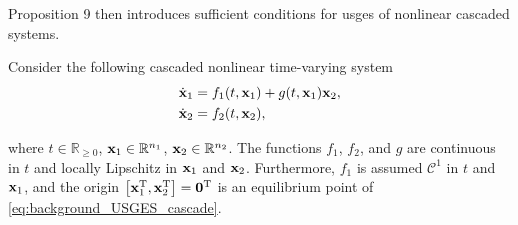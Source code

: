 Proposition 9 then introduces sufficient conditions for \acrfull{usges} of nonlinear cascaded systems.
\begin{prop}
    \label{prop:background_cascade}
    Consider the following cascaded nonlinear time-varying system
    \begin{subequations}
        \begin{align}
            \dot{\mathbf{x}}_1 &= f_1(t, \mathbf{x}_1) + g(t, \mathbf{x}_1)\mathbf{x}_2, \\
            \dot{\mathbf{x}}_2 &= f_2(t, \mathbf{x}_2),
        \end{align}
        \label{eq:background_USGES_cascade}
    \end{subequations}

    \vspace*{-1em}

    \noindent where $t \in \mathbb{R}_{\geq 0}$, $\mathbf{x}_1 \in \mathbb{R}^{n_1}$, $\mathbf{x}_2 \in \mathbb{R}^{n_2}$.
    The functions $f_1$, $f_2$, and $g$ are continuous in $t$ and locally Lipschitz in $\mathbf{x}_1$ and $\mathbf{x}_2$.
    Furthermore, $f_1$ is assumed $\mathcal{C}^1$ in $t$ and $\mathbf{x}_1$, and the origin $\left[\mathbf{x}_1^{\mathrm{T}}, \mathbf{x}_2^{\mathrm{T}}\right] = \mathbf{0}^{\mathrm{T}}$ is an equilibrium point of \eqref{eq:background_USGES_cascade}.


\end{prop}
